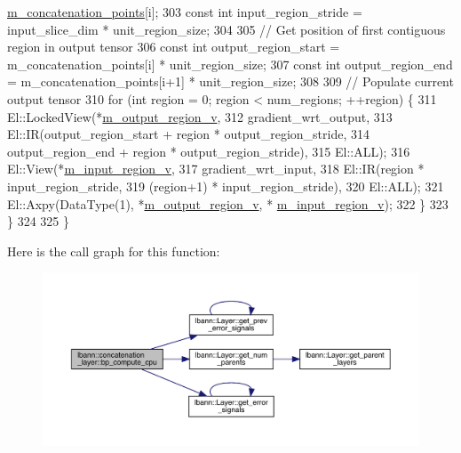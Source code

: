 \begin{DoxyCode}
      \hyperlink{classlbann_1_1concatenation__layer_a363324fe6cd104740334f3396085328c}{m\_concatenation\_points}[i];
303       \textcolor{keyword}{const} \textcolor{keywordtype}{int} input\_region\_stride = input\_slice\_dim * unit\_region\_size;
304 
305       \textcolor{comment}{// Get position of first contiguous region in output tensor}
306       \textcolor{keyword}{const} \textcolor{keywordtype}{int} output\_region\_start = m\_concatenation\_points[i] * unit\_region\_size;
307       \textcolor{keyword}{const} \textcolor{keywordtype}{int} output\_region\_end = m\_concatenation\_points[i+1] * unit\_region\_size;
308 
309       \textcolor{comment}{// Populate current output tensor}
310       \textcolor{keywordflow}{for} (\textcolor{keywordtype}{int} region = 0; region < num\_regions; ++region) \{
311         El::LockedView(*\hyperlink{classlbann_1_1concatenation__layer_af141bf9cf1569121a65a68e4ae97855c}{m\_output\_region\_v},
312                        gradient\_wrt\_output,
313                        El::IR(output\_region\_start + region * output\_region\_stride,
314                               output\_region\_end + region * output\_region\_stride),
315                        El::ALL);
316         El::View(*\hyperlink{classlbann_1_1concatenation__layer_afa68f2e5d3ea2de57f4974a37c01fc7b}{m\_input\_region\_v},
317                  gradient\_wrt\_input,
318                  El::IR(region * input\_region\_stride,
319                         (region+1) * input\_region\_stride),
320                  El::ALL);
321         El::Axpy(DataType(1), *\hyperlink{classlbann_1_1concatenation__layer_af141bf9cf1569121a65a68e4ae97855c}{m\_output\_region\_v}, *
      \hyperlink{classlbann_1_1concatenation__layer_afa68f2e5d3ea2de57f4974a37c01fc7b}{m\_input\_region\_v});
322       \}
323     \}
324 
325   \}
\end{DoxyCode}
Here is the call graph for this function\+:\nopagebreak
\begin{figure}[H]
\begin{center}
\leavevmode
\includegraphics[width=350pt]{classlbann_1_1concatenation__layer_a530ff478d02f3d69baf8432473979d00_cgraph}
\end{center}
\end{figure}
